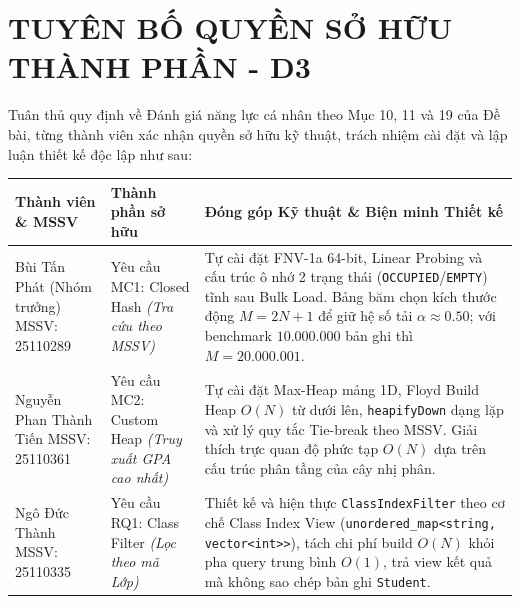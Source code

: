 \documentclass[14pt,a4paper]{extarticle}
\begin{document}
\newpage
\thispagestyle{empty}

\section*{TUYÊN BỐ QUYỀN SỞ HỮU THÀNH PHẦN - D3}

\noindent
Tuân thủ quy định về Đánh giá năng lực cá nhân theo Mục 10, 11 và 19 của Đề bài, từng thành viên xác nhận quyền sở hữu kỹ thuật, trách nhiệm cài đặt và lập luận thiết kế độc lập như sau:

\begin{table}[H]
\centering
\begingroup
{}
\setlength{\tabcolsep}{4pt}
\renewcommand{\arraystretch}{1.25}
\begin{tabularx}{\textwidth}{|>{\raggedright\arraybackslash}m{3.2cm}|>{\raggedright\arraybackslash}m{3.8cm}|>{\raggedright\arraybackslash}X|}
\hline
\textbf{Thành viên \& MSSV} & \textbf{Thành phần sở hữu} & \textbf{Đóng góp Kỹ thuật \& Biện minh Thiết kế} \\ \hline
Bùi Tấn Phát \newline (Nhóm trưởng) \newline MSSV: 25110289 & Yêu cầu MC1: Closed Hash \newline \textit{(Tra cứu theo MSSV)} & Tự cài đặt FNV-1a 64-bit, Linear Probing và cấu trúc ô nhớ 2 trạng thái (\texttt{OCCUPIED}/\texttt{EMPTY}) tĩnh sau Bulk Load. Bảng băm chọn kích thước động $M = 2N + 1$ để giữ hệ số tải $\alpha \approx 0.50$; với benchmark $10.000.000$ bản ghi thì $M = 20.000.001$. \\ \hline
Nguyễn Phan Thành Tiến \newline MSSV: 25110361 & Yêu cầu MC2: Custom Heap \newline \textit{(Truy xuất GPA cao nhất)} & Tự cài đặt Max-Heap mảng 1D, Floyd Build Heap $O(N)$ từ dưới lên, \texttt{heapifyDown} dạng lặp và xử lý quy tắc Tie-break theo MSSV. Giải thích trực quan độ phức tạp $O(N)$ dựa trên cấu trúc phân tầng của cây nhị phân. \\ \hline
Ngô Đức Thành \newline MSSV: 25110335 & Yêu cầu RQ1: Class Filter \newline \textit{(Lọc theo mã Lớp)} & Thiết kế và hiện thực \texttt{ClassIndexFilter} theo cơ chế Class Index View (\texttt{unordered\_map<string, vector<int>>}), tách chi phí build $O(N)$ khỏi pha query trung bình $O(1)$, trả view kết quả mà không sao chép bản ghi \texttt{Student}. \\ \hline

\end{tabularx}
\end{table}
\end{document}
